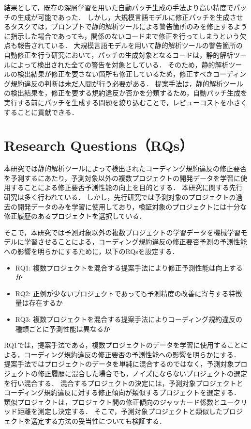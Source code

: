 \documentclass[11pt]{jreport}
\begin{document}
結果として，既存の深層学習を用いた自動パッチ生成の手法より高い精度でパッチの生成が可能であった．
しかし，大規模言語モデルに修正パッチを生成させるタスクでは，プロンプトで静的解析ツールによる警告箇所のみを修正するように指示した場合であっても，関係のないコードまで修正を行ってしまうという欠点も報告されている．
大規模言語モデルを用いて静的解析ツールの警告箇所の自動修正を行う研究において，パッチの生成対象となるコードは，静的解析ツールによって検出された全ての警告を対象としている．
そのため，静的解析ツールの検出結果が修正を要さない箇所も修正しているため，修正すべきコーディング規約違反の判断は未だ人間が行う必要がある．
提案手法は，静的解析ツールの検出結果を，修正を要する規約違反か否かを分類するため，自動パッチ生成を実行する前にパッチを生成する問題を絞り込むことで，レビューコストを小さくすることに貢献できる．


\section{Research Questions（RQs）}

本研究では静的解析ツールによって検出されたコーディング規約違反の修正要否を予測するにあたり，予測対象以外の複数プロジェクトの開発データを学習に使用することによる修正要否予測性能の向上を目的とする．
本研究に関する先行研究は多く行われている．
しかし，先行研究では予測対象のプロジェクトの過去の開発データのみを学習に使用しており，検証対象のプロジェクトには十分な修正履歴のあるプロジェクトを選択している．

そこで，本研究では予測対象以外の複数プロジェクトの学習データを機械学習モデルに学習させることによる，コーディング規約違反の修正要否予測の予測性能への影響を明らかにするために，以下のRQsを設定する．

\begin{itemize}
    \item RQ1: 複数プロジェクトを混合する提案手法により修正予測性能は向上するか
    \item RQ2: 正例が少ないプロジェクトであっても予測精度の改善に寄与する特徴量は存在するか
    \item RQ3: 複数プロジェクトを混合する提案手法によりコーディング規約違反の種類ごとに予測性能は異なるか
\end{itemize}

RQ1では，提案手法である，複数プロジェクトのデータを学習に使用することによる，コーディング規約違反の修正要否の予測性能への影響を明らかにする．
提案手法ではプロジェクトのデータを単純に混合するのではなく，予測対象プロジェクトの修正履歴に混合した場合でも，ノイズにならないプロジェクトの選定を行い混合する．
混合するプロジェクトの決定には，予測対象プロジェクトとコーディング規約違反に対する修正傾向が類似するプロジェクトを選定する．
類似プロジェクトは，プロジェクト間の修正傾向のジャッカード係数とユークリッド距離を測定し決定する．
そこで，予測対象プロジェクトと類似したプロジェクトを選定する方法の妥当性についても検証する．
\end{document}
